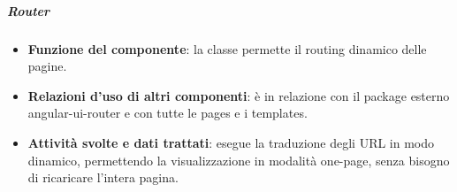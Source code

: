 \subparagraph{Router}
\begin{itemize}
	\item \textbf{Funzione del componente}: la classe permette il routing dinamico delle pagine.
	\item \textbf{Relazioni d’uso di altri componenti}: è in relazione con il package esterno angular-ui-router e con tutte le pages e i templates.
	\item \textbf{Attività svolte e dati trattati}: esegue la traduzione degli URL in modo dinamico, permettendo la visualizzazione in modalità one-page, senza bisogno di ricaricare l'intera pagina.
\end{itemize}